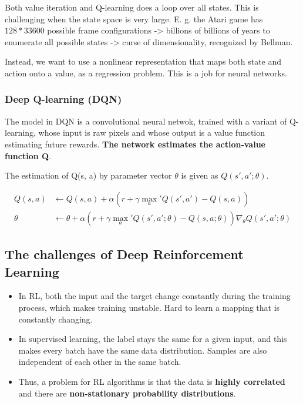 Both value iteration and Q-learning does a loop over all states. This is challenging when the state space is very large. E. g. the Atari game has $128*{33600}$ possible frame configurations -> billions of billions of years to enumerate all possible states -> curse of dimensionality, recognized by Bellman.

Instead, we want to use a nonlinear representation that maps both state and action onto a value, as a regression problem. This is a job for neural networks.

\subsubsection{Deep Q-learning (DQN)}

The model in DQN is a convolutional neural netwok, trained with a variant of Q-learning, whose input is raw pixels and whose output is a value function estimating future rewards. \textbf{The network estimates the action-value function Q}.

The estimation of Q(s, a) by parameter vector $\theta$ is given as $Q(s', a'; \theta)$. 

\begin{align}
    Q(s, a) &\longleftarrow Q(s, a) + \alpha(r + \gamma \max_a' Q(s', a') - Q(s, a)) \\
    \theta  &\longleftarrow \theta + \alpha(r + \gamma \max_a' Q(s', a'; \theta) - Q(s, a; \theta))\nabla_{\theta}Q(s', a'; \theta)
\end{align}

\subsection{The challenges of Deep Reinforcement Learning}

\begin{itemize}
    \item In RL, both the input and the target change constantly during the training process, which makes training unstable. Hard to learn a mapping that is constantly changing.
    \item In supervised learning, the label stays the same for a given input, and this makes every batch have the same data distribution. Samples are also independent of each other in the same batch. 
    \item Thus, a problem for RL algorithms is that the data is \textbf{highly correlated} and there are \textbf{non-stationary probability distributions}.
\end{itemize}

